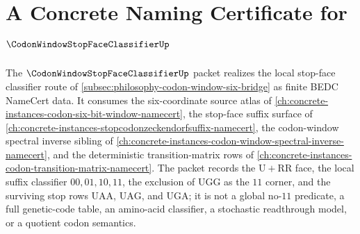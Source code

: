 \chapter{A Concrete Naming Certificate for $\CodonWindowStopFaceClassifierUp$}
\label{ch:concrete-instances-codon-window-stop-face-classifier-namecert}

The $\CodonWindowStopFaceClassifierUp$ packet realizes the local stop-face classifier route of \autoref{subsec:philosophy-codon-window-six-bridge} as finite BEDC NameCert data. It consumes the six-coordinate source atlas of \autoref{ch:concrete-instances-codon-six-bit-window-namecert}, the stop-face suffix surface of \autoref{ch:concrete-instances-stopcodonzeckendorfsuffix-namecert}, the codon-window spectral inverse sibling of \autoref{ch:concrete-instances-codon-window-spectral-inverse-namecert}, and the deterministic transition-matrix rows of \autoref{ch:concrete-instances-codon-transition-matrix-namecert}. The packet records the $\mathrm{U}+\mathrm{RR}$ face, the local suffix classifier $00,01,10,11$, the exclusion of $\mathrm{UGG}$ as the $11$ corner, and the surviving stop rows $\mathrm{UAA}$, $\mathrm{UAG}$, and $\mathrm{UGA}$; it is not a global no-$11$ predicate, a full genetic-code table, an amino-acid classifier, a stochastic readthrough model, or a quotient codon semantics.

